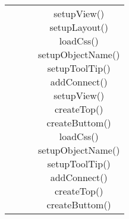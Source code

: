 \begin{center}
\begin{longtable}{|c|c|c|c|}
& & & \parbox[t]{\dimTipo} {setupView() \\ setupLayout() \\ loadCss() \\ setupObjectName() \\ setupToolTip() \\ addConnect() \\ setupView() \\ createTop() \\ createButtom() \\ loadCss() \\ setupObjectName() \\ setupToolTip() \\ addConnect() \\ createTop() \\ createButtom() \\ } \\
\hline


\end{longtable}
\end{center}
